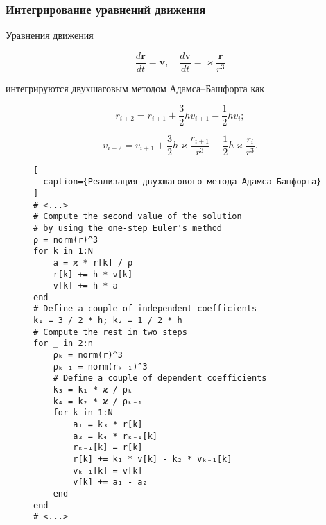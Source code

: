 \begin{frame}
\frametitle{Интегрирование уравнений движения}

Уравнения движения

\su
\begin{equation}
  \frac{d\mathbf{r}}{dt} = \mathbf{v}, \quad \frac{d \mathbf{v}}{dt} = \varkappa \frac{\mathbf{r}}{r^3}
\end{equation}

интегрируются двухшаговым методом Адамса--Башфорта как

\su
\begin{equation}
  r_{i+2} = r_{i+1} + \frac{3}{2} h v_{i+1} - \frac{1}{2} h v_i;
\end{equation}

\su
\begin{equation}
  v_{i+2} = v_{i+1} + \frac{3}{2} h \varkappa \frac{r_{i+1}}{r^3} - \frac{1}{2} h \varkappa \frac{r_i}{r^3}.
\end{equation}

\end{frame}

\captionsetup{singlelinecheck=false, justification=justified}

\begin{frame}[fragile]

\begin{figure}[h!]
\begin{lstlisting}[
  caption={Реализация двухшагового метода Адамса-Башфорта}
]
# <...>
# Compute the second value of the solution
# by using the one-step Euler's method
ρ = norm(r)^3
for k in 1:N
    a = ϰ * r[k] / ρ
    r[k] += h * v[k]
    v[k] += h * a
end
# Define a couple of independent coefficients
k₁ = 3 / 2 * h; k₂ = 1 / 2 * h
# Compute the rest in two steps
for _ in 2:n
    ρₖ = norm(r)^3
    ρₖ₋₁ = norm(rₖ₋₁)^3
    # Define a couple of dependent coefficients
    k₃ = k₁ * ϰ / ρₖ
    k₄ = k₂ * ϰ / ρₖ₋₁
    for k in 1:N
        a₁ = k₃ * r[k]
        a₂ = k₄ * rₖ₋₁[k]
        rₖ₋₁[k] = r[k]
        r[k] += k₁ * v[k] - k₂ * vₖ₋₁[k]
        vₖ₋₁[k] = v[k]
        v[k] += a₁ - a₂
    end
end
# <...>
\end{lstlisting}
\end{figure}

\end{frame}

\captionsetup{justification=centering}


